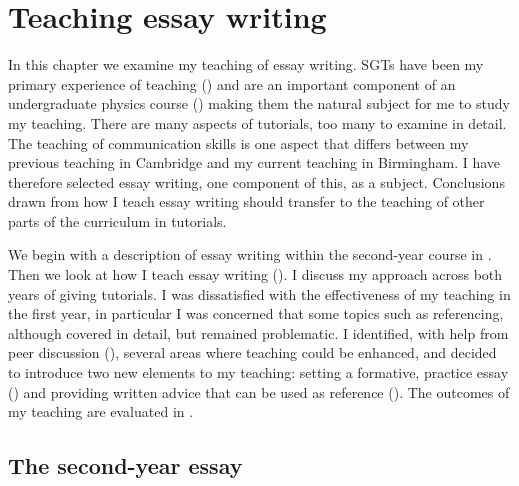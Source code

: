 \chapter{Teaching essay writing}\label{ch:essay}

In this chapter we examine my teaching of essay writing. SGTs have been my primary experience of teaching () and are an important component of an undergraduate physics course () making them the natural subject for me to study my teaching. There are many aspects of tutorials, too many to examine in detail. The teaching of communication skills is one aspect that differs between my previous teaching in Cambridge and my current teaching in Birmingham. I have therefore selected essay writing, one component of this, as a subject. Conclusions drawn from how I teach essay writing should transfer to the teaching of other parts of the curriculum in tutorials.

We begin with a description of essay writing within the second-year course in . Then we look at how I teach essay writing  (). I discuss my approach across both years of giving tutorials. I was dissatisfied with the effectiveness of my teaching in the first year, in particular I was concerned that some topics such as referencing, although covered in detail, but remained problematic. I identified, with help from peer discussion (), several areas where teaching could be enhanced, and decided to introduce two new elements to my teaching: setting a formative, practice essay () and providing written advice that can be used as reference (). The outcomes of my teaching are evaluated in .

\section{The second-year essay}\label{sec:problem}

